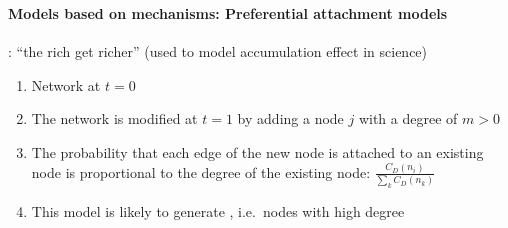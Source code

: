 \documentclass[8pt]{beamer}
\begin{document}

\begin{frame}
\frametitle{\insertsection}
\framesubtitle{Models based on mechanisms: Preferential attachment models}

{\color{blue}{Preferential attachment models}}: ``the rich get richer'' (used to model accumulation effect in science) \cite{Barabasi1999}

\begin{enumerate}
\item Network at $t=0$
\item The network is modified at $t=1$ by adding a node $j$ with a degree of $m>0$
\item The probability that each edge of the new node is attached to an existing node is proportional to the degree of the existing node: $\frac{C_D(n_i)}{\sum_k{C_D(n_k)}}$
\item This model is likely to generate {\color{blue}{hubs}}, i.e.\ nodes with high degree
\end{enumerate}

\end{frame}


\end{document}
